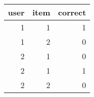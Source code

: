 \begin{tabular}{rrr}
\toprule
 user &  item &  correct \\
\midrule
    1 &     1 &        1 \\
    1 &     2 &        0 \\
    2 &     1 &        0 \\
    2 &     1 &        1 \\
    2 &     2 &        0 \\
\bottomrule
\end{tabular}
